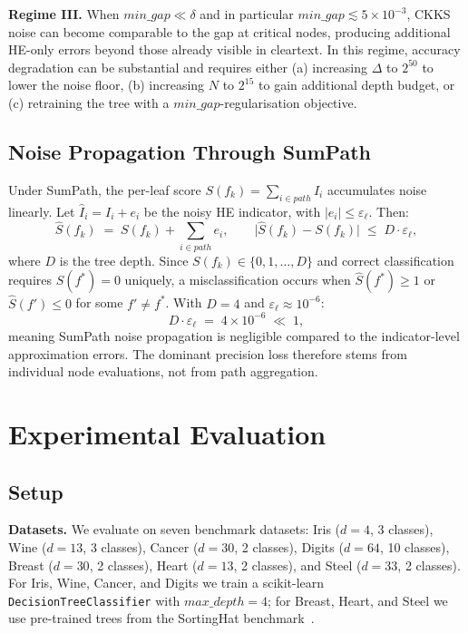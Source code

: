 \documentclass[runningheads]{llncs}
\begin{document}
\textbf{Regime III.}  When $\mathit{min\_gap} \ll \delta$ and in particular
$\mathit{min\_gap} \lesssim 5 \times 10^{-3}$, CKKS noise can become
comparable to the gap at critical nodes, producing additional HE-only errors
beyond those already visible in cleartext.  In this regime, accuracy
degradation can be substantial and requires either (a) increasing $\Delta$ to
$2^{50}$ to lower the noise floor, (b) increasing $N$ to $2^{15}$ to gain
additional depth budget, or (c) retraining the tree with a
$\mathit{min\_gap}$-regularisation objective.

\subsection{Noise Propagation Through SumPath}
\label{sec:noise_prop}

Under SumPath, the per-leaf score $S(f_k) = \sum_{i \in \mathit{path}} I_i$
accumulates noise linearly.  Let $\hat{I}_i = I_i + e_i$ be the noisy HE
indicator, with $|e_i| \leq \varepsilon_\ell$.  Then:
\begin{equation}
  \hat{S}(f_k) \;=\; S(f_k) + \sum_{i \in \mathit{path}} e_i, \qquad
  \bigl|\hat{S}(f_k) - S(f_k)\bigr| \;\leq\; D \cdot \varepsilon_\ell,
  \label{eq:noise_sum}
\end{equation}
where $D$ is the tree depth.  Since $S(f_k) \in \{0, 1, \ldots, D\}$ and
correct classification requires $S(f^*) = 0$ uniquely, a misclassification
occurs when $\hat{S}(f^*) \geq 1$ or $\hat{S}(f') \leq 0$ for some
$f' \neq f^*$.  With $D = 4$ and $\varepsilon_\ell \approx 10^{-6}$:
\begin{equation}
  D \cdot \varepsilon_\ell \;=\; 4 \times 10^{-6} \;\ll\; 1,
\end{equation}
meaning SumPath noise propagation is negligible compared to the
indicator-level approximation errors.  The dominant precision loss therefore
stems from individual node evaluations, not from path aggregation.

\section{Experimental Evaluation}
\label{sec:experiments}

\subsection{Setup}

\textbf{Datasets.}  We evaluate on seven benchmark datasets:
Iris ($d=4$, 3 classes), Wine ($d=13$, 3 classes), Cancer ($d=30$, 2
classes), Digits ($d=64$, 10 classes), Breast ($d=30$, 2 classes), Heart
($d=13$, 2 classes), and Steel ($d=33$, 2 classes).  For Iris, Wine, Cancer,
and Digits we train a scikit-learn \texttt{DecisionTreeClassifier} with
$\mathit{max\_depth} = 4$; for Breast, Heart, and Steel we use pre-trained
trees from the SortingHat benchmark~\cite{sortinghat}.
\end{document}
